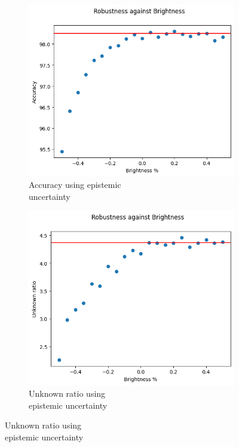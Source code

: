\begin{figure}[h]
	\centering
	\begin{subfigure}{.33\textwidth}
		\centering
		\includegraphics[width=0.9\linewidth]{ImageFiles/EvalBNN/BR/EU/acc}
		\caption{Accuracy using epistemic \\ uncertainty}
		\label{fig:br_eu_acc}
	\end{subfigure}%
	\begin{subfigure}{.33\textwidth}
		\centering
		\includegraphics[width=0.9\linewidth]{ImageFiles/EvalBNN/BR/EU/unkn}
		\caption{Unknown ratio using \\ epistemic uncertainty}
		\label{fig:br_eu_unkn}
	\end{subfigure}%

\end{figure}
